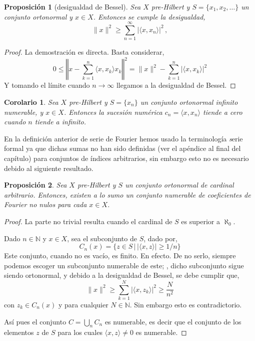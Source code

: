 \documentclass[12pt]{book}
\newtheorem{prop}{\bf Proposición}[chapter]
\newtheorem{coro}{Corolario}[chapter]
\def\NN{\mathbb{N}}
\newcommand{\abs}[1]{\lvert #1\rvert }
\newcommand{\norm}[1]{\lVert #1\rVert }
\newcommand{\lin}[1]{\langle #1 \rangle}
\newcommand{\Norm}[1]{\left\Vert #1\right\Vert }
\begin{document}
\begin{prop}[desigualdad de Bessel]
Sea $X$ pre-Hilbert y $S=\{x_1,x_2,\dots\}$ un conjunto  ortonormal y $x\in X$. Entonces se cumple la desigualdad,
$$\norm{x}^2 \geq  \sum_{n=1}^\infty \abs{\lin{x,x_n}}^2\,,$$
\end{prop}
\begin{proof}
La demostración es directa. Basta considerar,
$$0\leq \Norm{x-\sum_{k=1}^n \lin{x,x_k} x_k}^2=\norm{x}^2 -\sum_{k=1}^n\abs{\lin{x,x_k}}^2$$
Y tomando el límite cuando $n\to \infty$ llegamos a la desigualdad de Bessel.
\end{proof}
\begin{coro} Sea $X$ pre-Hilbert y $S=\{x_n\}$  un conjunto ortonormal infinito numerable, y $x\in X$. Entonces la sucesión numérica  $c_n=\lin{x,x_n}$ tiende a cero cuando $n$ tiende a infinito.
\end{coro}

En la definición anterior de serie de Fourier hemos usado la terminología {\emph serie formal} ya que dichas sumas no han sido definidas (ver el apéndice al final del capítulo) para conjuntos de índices arbitrarios, sin embargo esto no es necesario debido al siguiente resultado.
\begin{prop} Sea $X$ pre-Hilbert y $S$  un conjunto ortonormal de cardinal arbitrario. Entonces,  existen a lo sumo  un conjunto numerable  de coeficientes de Fourier no nulos para cada $x\in X$.
\end{prop}
\begin{proof}
  La parte no trivial resulta cuando el cardinal de $S$ es superior a $\aleph_0$.
 
 
   Dado $n\in \NN$ y  $x\in X$, sea el subconjunto de $S$, dado por,
 $$C_n(x)=\{z\in S\,|\, \abs{\lin{x,z}}\geq  1/n\}$$
Este conjunto, cuando no es    vacío,  es finito. En efecto. De no serlo, siempre podemos escoger un subconjunto numerable  de este; , dicho subconjunto    sigue siendo ortonormal, y   debido a la desigualdad de Bessel, se debe cumplir que,
    $$\norm{x}^2 \geq \sum_{k=1}^N \abs{\lin{x, z_k}}^2\geq \frac{N}{n^2}$$
con $z_k\in C_n(x)$ y para cualquier $N\in \NN$. Sin embargo  esto es contradictorio.
   
Así  pues el conjunto $C=\bigcup_n  C_n$  es numerable, es decir que el conjunto de los elementos $z$ de $S$ para los cuales $\lin{x,z}\not=0$ es numerable.

    
\end{proof} 
\end{document}
